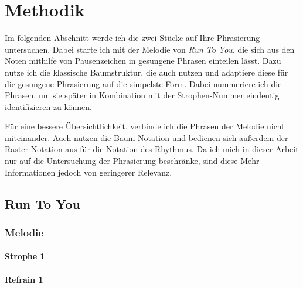 \chapter{Methodik}
\label{chap:Methodik}
\pagestyle{plain}

Im folgenden Abschnitt werde ich die zwei Stücke auf Ihre Phrasierung untersuchen. Dabei starte ich mit der Melodie von \textit{Run To You}, die sich aus den Noten mithilfe von Pausenzeichen in gesungene Phrasen einteilen lässt. Dazu nutze ich die klassische Baumstruktur, die auch \cite{lerdahl1983generative} nutzen und adaptiere diese für die gesungene Phrasierung auf die simpelste Form. Dabei nummeriere ich die Phrasen, um sie später in Kombination mit der Strophen-Nummer eindeutig identifizieren zu können. 

Für eine bessere Übersichtlichkeit, verbinde ich die Phrasen der Melodie nicht miteinander. Auch \cite{hayes1996role} nutzen die Baum-Notation und bedienen sich außerdem der Raster-Notation aus \cite{liberman1975intonational} für die Notation des Rhythmus. Da ich mich in dieser Arbeit nur auf die Untersuchung der Phrasierung beschränke, sind diese Mehr-Informationen jedoch von geringerer Relevanz.



\tiny 

\section*{Run To You}

\subsection*{Melodie}


\subsubsection*{Strophe 1}


\subsubsection*{Refrain 1}

